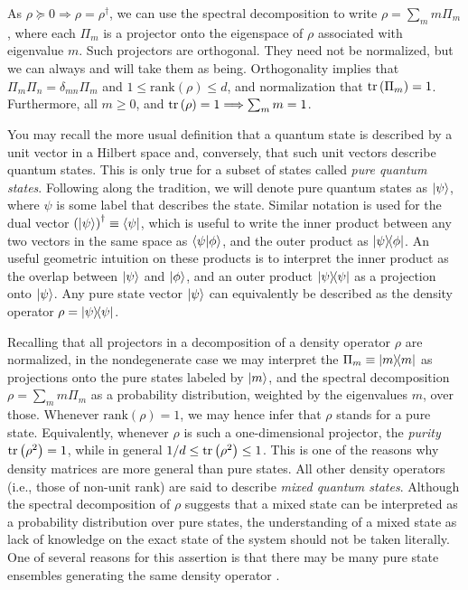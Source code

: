 		As $\rho \succeq 0 \Longrightarrow \rho = \rho^\dagger$, we can use the spectral decomposition to write $\rho = \sum_m m \Pi_m$, where each $\Pi_m$ is a projector onto the eigenspace of $\rho$ associated with eigenvalue $m$. Such projectors are orthogonal. They need not be normalized, but we can always and will take them as being. Orthogonality implies that $\Pi_m \Pi_n = \delta_{mn} \Pi_m$ and $1 \leq \text{rank}(\rho) \leq d$, and normalization that $\text{tr}\left( \Pi_m \right) = 1$.  Furthermore, all $m \geq 0$, and $\text{tr}\left( \rho \right) = 1 \Longrightarrow \sum_m m = 1$. 
	
		You may recall the more usual definition that a quantum state is described by a unit vector in a Hilbert space and, conversely, that such unit vectors describe quantum states. This is only true for a subset of states called \emph{pure quantum states}. Following along the tradition, we will denote pure quantum states as $\ket{\psi}$, where $\psi$ is some label that describes the state. Similar notation is used for the dual vector $\left( \ket{\psi} \right)^\dagger \equiv \bra{\psi}$, which is useful to write the inner product between any two vectors in the same space as $\braket{\psi}{\phi}$, and the outer product as $\ketbra{\psi}{\phi}$. An useful geometric intuition on these products is to interpret the inner product as the overlap between $\ket{\psi}$ and $\ket{\phi}$, and an outer product $\ketbra{\psi}{\psi}$ as a projection onto $\ket{\psi}$. Any pure state vector $\ket{\psi}$ can equivalently be described as the density operator $\rho = \ketbra{\psi}{\psi}$.
	
		Recalling that all projectors in a decomposition of a density operator $\rho$ are normalized, in the nondegenerate case we may interpret the $\Pi_m \equiv \ketbra{m}{m}$ as projections onto the pure states labeled by $\ket{m}$, and the spectral decomposition $\rho = \sum_m m \Pi_m$ as a probability distribution, weighted by the eigenvalues $m$, over those. Whenever $\text{rank}(\rho) = 1$, we may hence infer that $\rho$ stands for a pure state. Equivalently, whenever $\rho$ is such a one-dimensional projector, the \emph{purity} $\text{tr}\left( \rho^2 \right) = 1$, while in general $1/d \leq \text{tr}\left( \rho^2 \right) \leq 1$. This is one of the reasons why density matrices are more general than pure states. All other density operators (i.e., those of non-unit rank) are said to describe \emph{mixed quantum states}. Although the spectral decomposition of $\rho$ suggests that a mixed state can be interpreted as a probability distribution over pure states, the understanding of a mixed state as lack of knowledge on the exact state of the system should not be taken literally. One of several reasons for this assertion is that there may be many pure state ensembles generating the same density operator \cite{hughston_1993_densitymatrix}.
	

